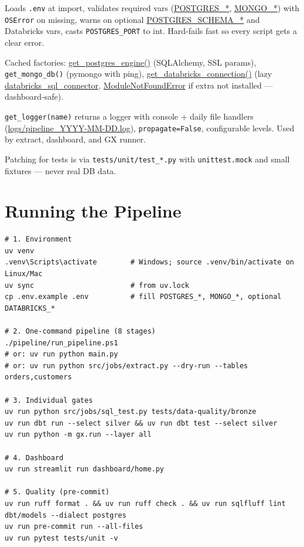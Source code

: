 \documentclass[11pt,a4paper]{article}
\begin{document}
\begin{description}[leftmargin=1.2em,style=nextline]
  \item[\texttt{src/utils/engine.py}] Loads \texttt{.env} at import, validates required vars (\url{POSTGRES_*}, \url{MONGO_*}) with \texttt{OSError} on missing, warns on optional \url{POSTGRES_SCHEMA_*} and Databricks vars, casts \texttt{POSTGRES\_PORT} to int. Hard-fails fast so every script gets a clear error.
  \item[\texttt{src/utils/connection.py}] Cached factories: \url{get_postgres_engine()} (SQLAlchemy, SSL params), \texttt{get\_mongo\_db()} (pymongo with ping), \url{get_databricks_connection()} (lazy \url{databricks_sql_connector}, \url{ModuleNotFoundError} if extra not installed — dashboard-safe).
  \item[\texttt{src/utils/logger.py}] \texttt{get\_logger(name)} returns a logger with console + daily file handlers (\url{logs/pipeline_YYYY-MM-DD.log}), \texttt{propagate=False}, configurable levels. Used by extract, dashboard, and GX runner.
\end{description}

Patching for tests is via \texttt{tests/unit/test\_*.py} with \texttt{unittest.mock} and small fixtures — never real DB data.

\section{Running the Pipeline}

\begin{lstlisting}[style=bash,caption={Local (Windows) — mirrors README ``Run it''.}]
# 1. Environment
uv venv
.venv\Scripts\activate        # Windows; source .venv/bin/activate on Linux/Mac
uv sync                       # from uv.lock
cp .env.example .env          # fill POSTGRES_*, MONGO_*, optional DATABRICKS_*

# 2. One-command pipeline (8 stages)
./pipeline/run_pipeline.ps1
# or: uv run python main.py
# or: uv run python src/jobs/extract.py --dry-run --tables orders,customers

# 3. Individual gates
uv run python src/jobs/sql_test.py tests/data-quality/bronze
uv run dbt run --select silver && uv run dbt test --select silver
uv run python -m gx.run --layer all

# 4. Dashboard
uv run streamlit run dashboard/home.py

# 5. Quality (pre-commit)
uv run ruff format . && uv run ruff check . && uv run sqlfluff lint dbt/models --dialect postgres
uv run pre-commit run --all-files
uv run pytest tests/unit -v
\end{lstlisting}
\end{document}
